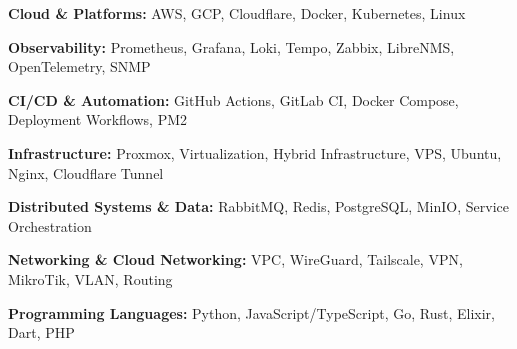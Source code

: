 \textbf{Cloud \& Platforms:} AWS, GCP, Cloudflare, Docker, Kubernetes, Linux\par
\textbf{Observability:} Prometheus, Grafana, Loki, Tempo, Zabbix, LibreNMS, OpenTelemetry, SNMP\par
\textbf{CI/CD \& Automation:} GitHub Actions, GitLab CI, Docker Compose, Deployment Workflows, PM2\par
\textbf{Infrastructure:} Proxmox, Virtualization, Hybrid Infrastructure, VPS, Ubuntu, Nginx, Cloudflare Tunnel\par
\textbf{Distributed Systems \& Data:} RabbitMQ, Redis, PostgreSQL, MinIO, Service Orchestration\par
\textbf{Networking \& Cloud Networking:} VPC, WireGuard, Tailscale, VPN, MikroTik, VLAN, Routing\par
\textbf{Programming Languages:} Python, JavaScript/TypeScript, Go, Rust, Elixir, Dart, PHP
